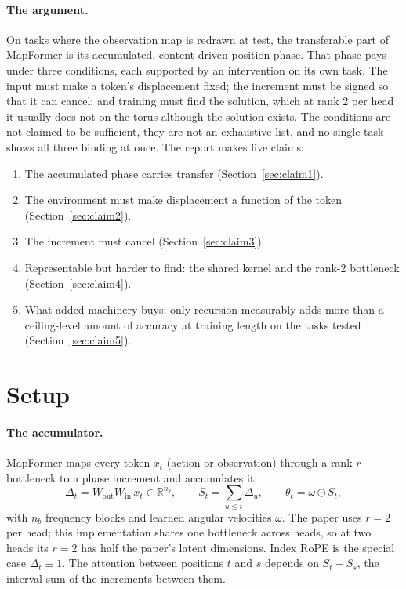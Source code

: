\documentclass[10pt]{article}
\newcommand{\R}{\mathbb{R}}
\newcommand{\nb}{n_b}
\begin{document}
\paragraph{The argument.} On tasks where the observation map is redrawn at test, the transferable part of
MapFormer is its accumulated, content-driven position phase. That phase pays under three conditions, each
supported by an intervention on its own task. The input must make a token's displacement fixed; the increment
must be signed so that it can cancel; and training must find the solution, which at rank 2 per head it usually
does not on the torus although the solution exists. The conditions are not claimed to be sufficient, they are not an exhaustive
list, and no single task shows all three binding at once. The report makes five claims:
\begin{enumerate}[leftmargin=1.6em]
\item The accumulated phase carries transfer (Section~\ref{sec:claim1}).
\item The environment must make displacement a function of the token (Section~\ref{sec:claim2}).
\item The increment must cancel (Section~\ref{sec:claim3}).
\item Representable but harder to find: the shared kernel and the rank-2 bottleneck (Section~\ref{sec:claim4}).
\item What added machinery buys: only recursion measurably adds more than a ceiling-level amount of accuracy at
training length on the tasks tested (Section~\ref{sec:claim5}).
\end{enumerate}

\section{Setup}
\label{sec:setup}

\paragraph{The accumulator.} MapFormer maps every token $x_t$ (action or observation) through a rank-$r$
bottleneck to a phase increment and accumulates it:
\begin{equation}
\Delta_t = W_{\mathrm{out}} W_{\mathrm{in}}\, x_t \in \R^{\nb},\qquad
S_t = \sum_{u\le t} \Delta_u,\qquad
\theta_t = \omega \odot S_t ,
\label{eq:accum}
\end{equation}
with $\nb$ frequency blocks and learned angular velocities $\omega$. The paper uses $r=2$ per head; this
implementation shares one bottleneck across heads, so at two heads its $r=2$ has half the paper's latent
dimensions. Index RoPE
\citep{su2021roformer} is the special case $\Delta_t\equiv 1$. The attention between positions $t$ and $s$ depends
on $S_t-S_s$, the interval sum of the increments between them.
\end{document}
